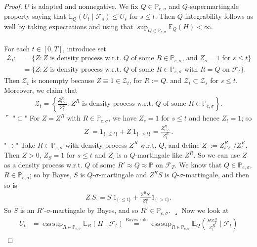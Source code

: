 \documentclass[12pt,a4paper, twoside]{article}
\theoremstyle{definition}
\newcommand{\EE}{\mathbb{E}} %
\newcommand{\PP}{\mathbb{P}} %
\DeclareMathOperator*{\esssup}{ess\,sup}
\begin{document}
\begin{proof}
$U$ is adapted and nonnegative. We fix $Q \in \PP_{e, \sigma}$ and $Q$-supermartingale property saying that $\EE_Q(U_t \mid \mathcal{F}_s) \leq U_s$ for $s \leq t$. Then $Q$-integrability follows as well by taking expectations and using that $\sup_{Q \in \PP_{e, \sigma}} \EE_Q(H) < \infty$. 
\\\\
For each $t \in [0,T]$, introduce set 
\begin{align*}
\mathcal{Z}_t :&= \{ Z : Z \text{ is density process w.r.t. $Q$ of some $R \in \PP_{e, \sigma}$, and $Z_s=1$ for $s \leq t$}\} \\
&= \{ Z : Z \text{ is density process w.r.t. $Q$ of some $R \in \PP_{e, \sigma}$ with $R=Q$ on $\mathcal{F}_t$}\}.
\end{align*}
Then $ \mathcal{Z}_t$ is nonempty because $Z \equiv 1 \in \mathcal{Z}_t$, for $R:= Q$. and $\mathcal{Z}_t \subset \mathcal{Z}_s$ for $s \leq t$. Moreover, we claim that 
\begin{align*}
\mathcal{Z}_t = \left\{ \frac{Z_{t \vee \cdot}^R}{Z_t^R}: Z^R \text{ is density process w.r.t. $Q$ of some $R \in \PP_{e, \sigma}$} \right\}.
\end{align*}
$\ulcorner$ "$\subset$" For $Z=Z^R$ with $R \in \PP_{e, \sigma}$, we have $Z_s=1$ for $s \leq t$ and hence $Z_t=1$; so 
\begin{align*}
Z_\cdot = 1_{\{ \cdot \leq t \}} + Z_\cdot 1_{\{ \cdot > t\}} =  \frac{Z_{t \vee  \cdot}^R}{Z_t^R}. 
\end{align*}
"$\supset$" Take $R \in \PP_{e, \sigma}$ with density process $Z^R$ w.r.t. $Q$, and define $Z_\cdot := Z_{t \vee  \cdot }^R / Z_t^R$. Then $Z >0$, $Z_S=1$ for $s \leq t$ and  $Z_\cdot$ is a $Q$-martingale like $Z^R$. So we can use $Z$ as a density process w.r.t. $Q$ of some $R' \approx Q \approx \PP$ on $\mathcal{F}_T$. We know that $Q \in \PP_{e, \sigma}$, $R \in \PP_{e, \sigma}$; so by Bayes, $S$ is $Q$-$\sigma$-martingale and $Z^RS$ is $Q$-$\sigma$-martingale, and then so is  
\begin{align*}
Z_\cdot S_\cdot = S_\cdot 1_{\{ \cdot \leq t \}} + \frac{Z_\cdot^RS_\cdot}{Z_t^R}1_{\{ \cdot > t\}}.
\end{align*}
So $S$ is an $R'$-$\sigma$-martingale by Bayes, and so $R' \in \PP_{e, \sigma}$. \hfill $ \lrcorner$ \newpage 
Now we look at 
\begin{align*}
U_t &= \esssup_{R \in \PP_{e, \sigma}} \EE_R(H \mid \mathcal{F}_t) \overset{\text{Bayes rule}} = \esssup_{R \in \PP_{e, \sigma}} \EE_Q \left( \frac{H Z_T^R}{Z_t^R} \mid \mathcal{F}_t \right)  \\

\end{align*}
\end{proof}
\end{document}
